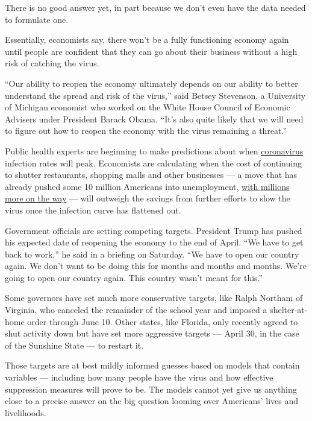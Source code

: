 There is no good answer yet, in part because we don't even have the data
needed to formulate one.

Essentially, economists say, there won't be a fully functioning economy
again until people are confident that they can go about their business
without a high risk of catching the virus.

``Our ability to reopen the economy ultimately depends on our ability to
better understand the spread and risk of the virus,'' said Betsey
Stevenson, a University of Michigan economist who worked on the White
House Council of Economic Advisers under President Barack Obama. ``It's
also quite likely that we will need to figure out how to reopen the
economy with the virus remaining a threat.''

Public health experts are beginning to make predictions about when
\href{https://www.nytimes.com/2020/04/13/business/coronavirus-economy.html}{coronavirus}
infection rates will peak. Economists are calculating when the cost of
continuing to shutter restaurants, shopping malls and other businesses
--- a move that has already pushed some 10 million Americans into
unemployment,
\href{https://www.nytimes.com/2020/04/03/upshot/coronavirus-jobless-rate-great-depression.html}{with
millions more on the way} --- will outweigh the savings from further
efforts to slow the virus once the infection curve has flattened out.

Government officials are setting competing targets. President Trump has
pushed his expected date of reopening the economy to the end of April.
``We have to get back to work,'' he said in a briefing on Saturday. ``We
have to open our country again. We don't want to be doing this for
months and months and months. We're going to open our country again.
This country wasn't meant for this.''

Some governors have set much more conservative targets, like Ralph
Northam of Virginia, who canceled the remainder of the school year and
imposed a shelter-at-home order through June 10. Other states, like
Florida, only recently agreed to shut activity down but have set more
aggressive targets --- April 30, in the case of the Sunshine State ---
to restart it.

Those targets are at best mildly informed guesses based on models that
contain variables --- including how many people have the virus and how
effective suppression measures will prove to be. The models cannot yet
give us anything close to a precise answer on the big question looming
over Americans' lives and livelihoods.

